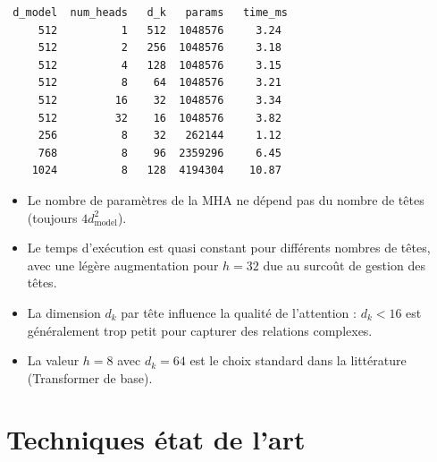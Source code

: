 \begin{codeoutput}
\begin{verbatim}
 d_model  num_heads   d_k   params   time_ms
     512          1   512  1048576     3.24
     512          2   256  1048576     3.18
     512          4   128  1048576     3.15
     512          8    64  1048576     3.21
     512         16    32  1048576     3.34
     512         32    16  1048576     3.82
     256          8    32   262144     1.12
     768          8    96  2359296     6.45
    1024          8   128  4194304    10.87
\end{verbatim}
\end{codeoutput}

\begin{remarque}[Observations]
\begin{itemize}
  \item Le nombre de param\`etres de la MHA ne d\'epend pas du nombre de
    t\^etes (toujours $4 d_{\text{model}}^2$).
  \item Le temps d'ex\'ecution est quasi constant pour diff\'erents nombres
    de t\^etes, avec une l\'eg\`ere augmentation pour $h = 32$ due au surco\^ut
    de gestion des t\^etes.
  \item La dimension $d_k$ par t\^ete influence la qualit\'e de l'attention :
    $d_k < 16$ est g\'en\'eralement trop petit pour capturer des relations
    complexes.
  \item La valeur $h = 8$ avec $d_k = 64$ est le choix standard dans la
    litt\'erature (Transformer de base).
\end{itemize}
\end{remarque}

\section{Techniques \'etat de l'art}
\label{sec:attention-sota}

